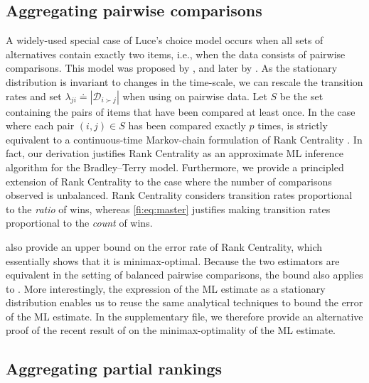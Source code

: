 \subsection{Aggregating pairwise comparisons}
\label{fi:sec:pairwise}

A widely-used special case of Luce's choice model occurs when all sets of alternatives contain exactly two items, i.e., when the data consists of pairwise comparisons.
This model was proposed by \citet{zermelo1928berechnung}, and later by \citet{bradley1952rank}.
As the stationary distribution is invariant to changes in the time-scale, we can rescale the transition rates and set $\lambda_{ji} \doteq |\mathcal{D}_{i \succ j}|$ when using \LSR{} on pairwise data.
Let $S$ be the set containing the pairs of items that have been compared at least once.
In the case where each pair $(i, j) \in S$ has been compared exactly $p$ times, \LSR{} is strictly equivalent to a continuous-time Markov-chain formulation of Rank Centrality \citep{negahban2012iterative}.
In fact, our derivation justifies Rank Centrality as an approximate ML inference algorithm for the Bradley--Terry model.
Furthermore, we provide a principled extension of Rank Centrality to the case where the number of comparisons observed is unbalanced.
Rank Centrality considers transition rates proportional to the \emph{ratio} of wins, whereas \eqref{fi:eq:master} justifies making transition rates proportional to the \emph{count} of wins.

\citet{negahban2012iterative} also provide an upper bound on the error rate of Rank Centrality, which essentially shows that it is minimax-optimal.
Because the two estimators are equivalent in the setting of balanced pairwise comparisons, the bound also applies to \LSR{}.
More interestingly, the expression of the ML estimate as a stationary distribution enables us to reuse the same analytical techniques to bound the error of the ML estimate.
In the supplementary file, we therefore provide an alternative proof of the recent result of \citet{hajek2014minimax} on the minimax-optimality of the ML estimate.

\subsection{Aggregating partial rankings}
\label{fi:sec:partial}

